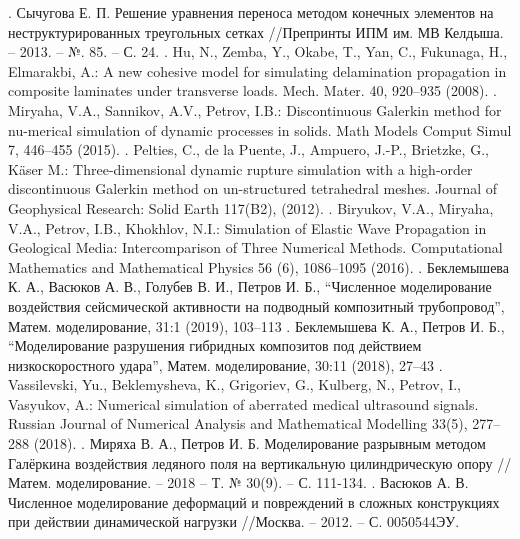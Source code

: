 \documentclass[14pt]{article}
\begin{document}
. \: Сычугова Е. П. Решение уравнения переноса методом конечных элементов на неструктурированных треугольных сетках //Препринты ИПМ им. МВ Келдыша. – 2013. – №. 85. – С. 24.
. \: Hu, N., Zemba, Y., Okabe, T., Yan, C., Fukunaga, H., Elmarakbi, A.: A new cohesive model for simulating delamination propagation in composite laminates under transverse loads. Mech. Mater. 40, 920–935 (2008).
. \: Miryaha, V.A., Sannikov, A.V., Petrov, I.B.: Discontinuous Galerkin method for nu-merical simulation of dynamic processes in solids. Math Models Comput Simul 7, 446–455 (2015).
. \: Pelties, C., de la Puente, J., Ampuero, J.-P., Brietzke, G., Käser M.: Three‐dimensional dynamic rupture simulation with a high‐order discontinuous Galerkin method on un-structured tetrahedral meshes. Journal of Geophysical Research: Solid Earth 117(B2), (2012).
. \: Biryukov, V.A., Miryaha, V.A., Petrov, I.B., Khokhlov, N.I.: Simulation of Elastic Wave Propagation in Geological Media: Intercomparison of Three Numerical Methods. Computational Mathematics and Mathematical Physics 56 (6), 1086–1095 (2016).
. \: Беклемышева К. А.,  Васюков А. В.,  Голубев В. И.,  Петров И. Б., “Численное моделирование воздействия сейсмической активности на подводный композитный трубопровод”, Матем. моделирование, 31:1 (2019),  103–113
. \:  Беклемышева К. А., Петров И. Б., “Моделирование разрушения гибридных композитов под действием низкоскоростного удара”, Матем. моделирование, 30:11 (2018),  27–43
. \: Vassilevski, Yu., Beklemysheva, K., Grigoriev, G., Kulberg, N., Petrov, I., Vasyukov, A.: Numerical simulation of aberrated medical ultrasound signals. Russian Journal of Numerical Analysis and Mathematical Modelling 33(5), 277–288 (2018).
. \: Миряха В. А., Петров И. Б. Моделирование разрывным методом Галёркина воздействия ледяного поля на вертикальную цилиндрическую опору // Матем. моделирование. – 2018 – Т. № 30(9). – С. 111-134.
. \: Васюков А. В. Численное моделирование деформаций и повреждений в сложных конструкциях при действии динамической нагрузки //Москва. – 2012. – С. 0050544ЭУ.
\end{document}
